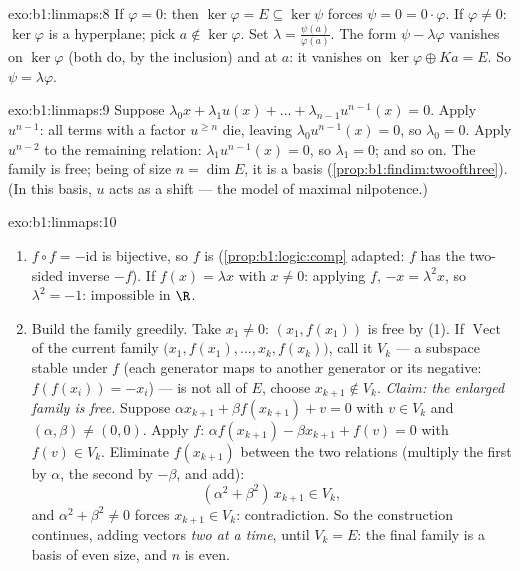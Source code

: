 \begin{solution}{exo:b1:linmaps:8}
If $\varphi = 0$: then $\ker\varphi = E \subseteq \ker\psi$ forces
$\psi = 0 = 0\cdot\varphi$. If $\varphi \neq 0$: $\ker\varphi$ is a
hyperplane; pick $a \notin \ker\varphi$. Set $\lambda =
\frac{\psi(a)}{\varphi(a)}$. The form $\psi - \lambda\varphi$
vanishes on $\ker\varphi$ (both do, by the inclusion) and at $a$:
it vanishes on $\ker\varphi \oplus Ka = E$. So $\psi =
\lambda\varphi$.
\end{solution}

\begin{solution}{exo:b1:linmaps:9}
Suppose $\lambda_0 x + \lambda_1 u(x) + \dots + \lambda_{n-1}
u^{n-1}(x) = 0$. Apply $u^{n-1}$: all terms with a factor $u^{\geq
n}$ die, leaving $\lambda_0 u^{n-1}(x) = 0$, so $\lambda_0 = 0$.
Apply $u^{n-2}$ to the remaining relation: $\lambda_1 u^{n-1}(x) =
0$, so $\lambda_1 = 0$; and so on. The family is free; being of size
$n = \dim E$, it is a basis (\cref{prop:b1:findim:twoofthree}). (In
this basis, $u$ acts as a shift --- the model of maximal
nilpotence.)
\end{solution}

\begin{solution}{exo:b1:linmaps:10}
\begin{enumerate}
  \item $f \circ f = -\mathrm{id}$ is bijective, so $f$ is
        (\cref{prop:b1:logic:comp} adapted: $f$ has the two-sided
        inverse $-f$). If $f(x) = \lambda x$ with $x \neq 0$:
        applying $f$, $-x = \lambda^2 x$, so $\lambda^2 = -1$:
        impossible in $\R$.
  \item Build the family greedily. Take $x_1 \neq 0$: $(x_1,
        f(x_1))$ is free by (1). If $\operatorname{Vect}$ of the
        current family $\bigl(x_1, f(x_1), \dots, x_k,
        f(x_k)\bigr)$, call it $V_k$ --- a subspace stable under $f$
        (each generator maps to another generator or its negative:
        $f(f(x_i)) = -x_i$) --- is not all of $E$, choose $x_{k+1}
        \notin V_k$. \emph{Claim: the enlarged family is free.}
        Suppose $\alpha x_{k+1} + \beta f(x_{k+1}) + v = 0$ with $v
        \in V_k$ and $(\alpha, \beta) \neq (0,0)$. Apply $f$:
        $\alpha f(x_{k+1}) - \beta x_{k+1} + f(v) = 0$ with $f(v)
        \in V_k$. Eliminate $f(x_{k+1})$ between the two relations
        (multiply the first by $\alpha$, the second by $-\beta$, and
        add):
        \[
        (\alpha^2 + \beta^2)\, x_{k+1} \in V_k ,
        \]
        and $\alpha^2 + \beta^2 \neq 0$ forces $x_{k+1} \in V_k$:
        contradiction. So the construction continues, adding vectors
        \emph{two at a time}, until $V_k = E$: the final family is a
        basis of even size, and $n$ is even.
\end{enumerate}
\end{solution}

